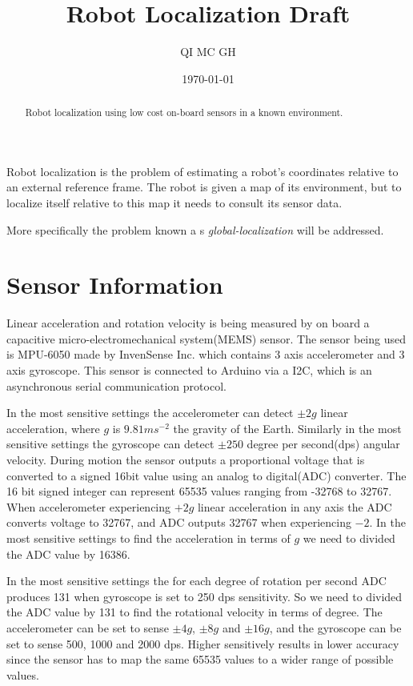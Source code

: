 \documentclass{article}
\title{Robot Localization Draft}
\author{QI MC GH}
\date{\today}
\begin{document}
\maketitle %

\begin{abstract}
Robot localization using low cost on-board sensors in a known environment.
\end{abstract}

Robot localization is the problem of estimating a robot’s coordinates relative to an external reference frame. The robot is given a map of its environment, but to localize itself relative to this map it needs to consult its sensor data.

More specifically the problem known a s \textit{global-localization} will be addressed.

\section{Sensor Information}
Linear acceleration and rotation velocity is being measured by on board a capacitive micro-electromechanical system(MEMS) sensor. The sensor being used is MPU-6050 made by InvenSense Inc. which contains 3 axis accelerometer and 3 axis gyroscope. This sensor is connected to Arduino via a I2C, which is an asynchronous serial communication protocol.

In the most sensitive settings the accelerometer can detect $\pm2g$ linear acceleration, where $g$ is $9.81ms^{-2}$ the gravity of the Earth. Similarly in the most sensitive settings the gyroscope can detect $\pm250$ degree per second(dps) angular velocity. During motion the sensor outputs a proportional voltage that is converted to a signed 16bit value using an analog to digital(ADC) converter. The 16 bit signed integer can represent 65535 values ranging from -32768 to 32767. When accelerometer experiencing $+2g$ linear acceleration in any axis the ADC converts voltage to 32767, and ADC outputs 32767 when experiencing $-2$. In the most sensitive settings to find the acceleration in terms of $g$ we need to divided the ADC value by 16386. 

In the most sensitive settings the for each degree of rotation per second ADC produces 131 when gyroscope is set to 250 dps sensitivity. So we need to divided the ADC value by 131 to find the rotational velocity in terms of degree. The accelerometer can be set to sense $\pm4g$, $\pm8g$ and $\pm16g$, and the gyroscope can be set to sense 500, 1000 and 2000 dps. Higher sensitively results in lower accuracy since the sensor has to map the same 65535 values to a wider range of possible values.
\end{document}
